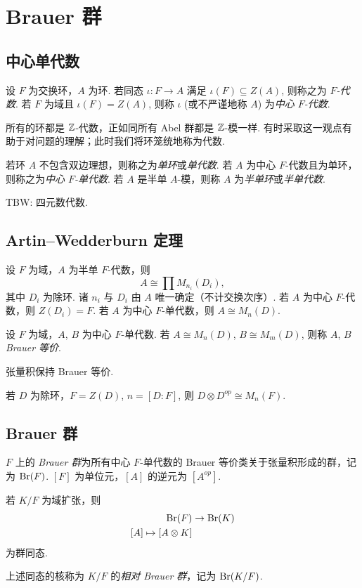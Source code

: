 \chapter{Brauer 群}

\section{中心单代数}
\begin{defn}
  设 $F$ 为交换环，$A$ 为环.  若同态 $\iota \colon F \to A$ 满足 $\iota(F) \subseteq Z(A)$, 则称之为 \emph{$F$-代数}.  若 $F$ 为域且 $\iota(F) = Z(A)$, 则称 $\iota$ (或不严谨地称 $A$) 为\emph{中心 $F$-代数}.
\end{defn}
所有的环都是 $\mathbb Z$-代数，正如同所有 Abel 群都是 $\mathbb Z$-模一样.  有时采取这一观点有助于对问题的理解；此时我们将环笼统地称为代数.

\begin{defn}
  若环 $A$ 不包含双边理想，则称之为\emph{单环}或\emph{单代数}.  若 $A$ 为中心 $F$-代数且为单环，则称之为\emph{中心 $F$-单代数}.  若 $A$ 是半单 $A$-模，则称 $A$ 为\emph{半单环}或\emph{半单代数}.
\end{defn}

TBW: 四元数代数.

\section{Artin--Wedderburn 定理}
\begin{thm}
  设 $F$ 为域，$A$ 为半单 $F$-代数，则
  \[ A \cong \prod M_{n_i}(D_i), \]
  其中 $D_i$ 为除环.  诸 $n_i$ 与 $D_i$ 由 $A$ 唯一确定（不计交换次序）.  若 $A$ 为中心 $F$-代数，则 $Z(D_i) = F$.  若 $A$ 为中心 $F$-单代数，则 $A \cong M_{n}(D)$.
\end{thm}

\begin{defn}
  设 $F$ 为域，$A$, $B$ 为中心 $F$-单代数.  若 $A \cong M_n(D)$, $B \cong M_m(D)$, 则称 $A$, $B$ \emph{Brauer 等价}.
\end{defn}

\begin{thm}
  张量积保持 Brauer 等价.
\end{thm}

\begin{thm}
  若 $D$ 为除环，$F = Z(D)$, $n = [D:F]$, 则 $D \otimes D^{op} \cong M_n(F)$.
\end{thm}

\section{Brauer 群}
\begin{defn}
  $F$ 上的 \emph{Brauer 群}为所有中心 $F$-单代数的 Brauer 等价类关于张量积形成的群，记为 $\operatorname{Br}(F)$.  $[F]$ 为单位元，$[A]$ 的逆元为 $[A^{op}]$.
\end{defn}

\begin{thm}
  若 $K/F$ 为域扩张，则
  \begin{align*}
    \operatorname{Br}(F) &\to \operatorname{Br}(K) \\
    [A] \mapsto [A \otimes K]
  \end{align*}
  为群同态.
\end{thm}
\begin{defn}
  上述同态的核称为 $K/F$ 的\emph{相对 Brauer 群}，记为 $\operatorname{Br}(K/F)$.
\end{defn}
